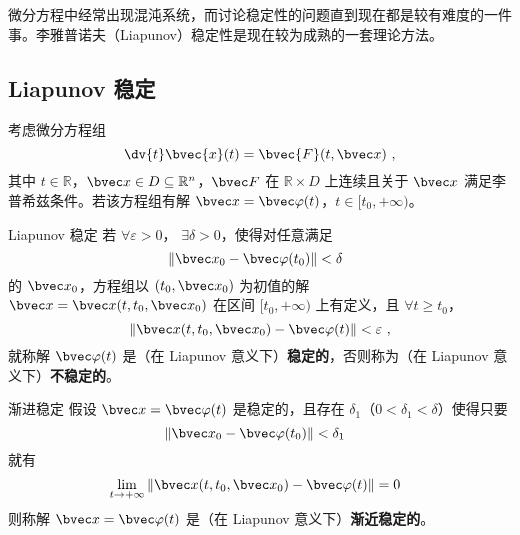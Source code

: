 
\begin{issues}
\issueMissDepend
\end{issues}

微分方程中经常出现混沌系统，而讨论稳定性的问题直到现在都是较有难度的一件事。李雅普诺夫（Liapunov）稳定性是现在较为成熟的一套理论方法。

\subsection{Liapunov 稳定}
考虑微分方程组 
\begin{equation}
\dv{t} \bvec{x}(t) = \bvec{F}(t, \bvec x) ~,
\end{equation}
其中 $t \in \mathbb R$，$\bvec x \in D \subseteq \mathbb R^n$，$\bvec F$ 在 $\mathbb R \times D$ 上连续且关于 $\bvec x$ 满足李普希兹条件。若该方程组有解 $\bvec x = \bvec \varphi(t)$，$t \in [t_0, +\infty)$。

\begin{definition}{Liapunov 稳定}
若 $\forall \varepsilon > 0$， $\exists \delta > 0$，使得对任意满足 
\begin{equation}
\Vert \bvec x_0 - \bvec \varphi(t_0)\Vert < \delta ~~
\end{equation}
的 $\bvec x_0$，方程组以 $(t_0, \bvec x_0)$ 为初值的解 $\bvec x= \bvec x(t, t_0, \bvec x_0)$ 在区间 $[t_0, +\infty)$ 上有定义，且 $\forall t \ge t_0$，
\begin{equation}
\Vert  \bvec x(t, t_0, \bvec x_0) - \bvec \varphi(t) \Vert < \varepsilon ~,
\end{equation}
就称解 $\bvec \varphi(t)$ 是（在 Liapunov 意义下）\textbf{稳定的}，否则称为（在 Liapunov 意义下）\textbf{不稳定的}。

\end{definition}

\begin{definition}{渐进稳定}
假设 $\bvec x = \bvec \varphi(t)$ 是稳定的，且存在 $\delta_1$（$0 < \delta_1 < \delta$）使得只要
\begin{equation}
\Vert \bvec x_0 - \bvec \varphi(t_0) \Vert < \delta_1 ~~
\end{equation}
就有
\begin{equation}
\lim_{t \to +\infty} \Vert  \bvec x(t, t_0, \bvec x_0) - \bvec \varphi(t) \Vert = 0 ~~
\end{equation}
则称解 $\bvec x = \bvec \varphi(t)$ 是（在 Liapunov 意义下）\textbf{渐近稳定的}。

\end{definition}

